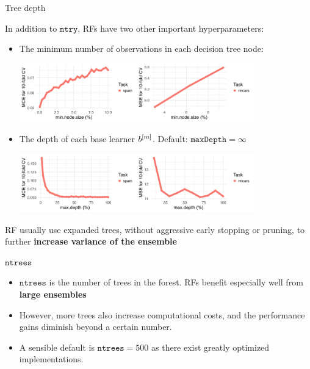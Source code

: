 \documentclass[11pt,compress,t,notes=noshow, xcolor=table]{beamer}
\begin{document}
\begin{vbframe}{Tree depth}

In addition to $\texttt{mtry}$, RFs have two other important hyperparameters:

\begin{itemize}
  \item The minimum number of observations in each decision tree node:
\begin{center}
\includegraphics[width=0.8\textwidth]{figure/forest-minnode.png}
\end{center}
  \item The depth of each base learner $b^{[m]}$. Default: $\texttt{maxDepth} = \infty$
\begin{center}
\includegraphics[width=0.8\textwidth]{figure/forest-maxdepth.png}
\end{center}
\end{itemize}

RF usually use expanded trees, without aggressive early stopping or pruning, to further \textbf{increase variance of the ensemble} 
\end{vbframe}

\begin{vbframe}{$\texttt{ntrees}$}
\begin{itemize}
\item $\texttt{ntrees}$ is the number of trees in the forest. RFs benefit especially well from \textbf{large ensembles} 
\item However, more trees also increase computational costs, and the performance gains diminish beyond a certain number.
\item A sensible default is $\texttt{ntrees} = 500$ as there exist greatly optimized implementations.
\end{itemize}
\end{vbframe}
\end{document}
